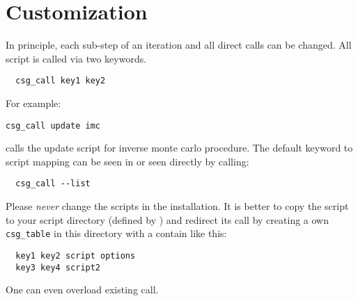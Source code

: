 \section{Customization}
In principle, each sub-step of an iteration and all direct calls can be changed.
All script is called via two keywords.
\begin{verbatim}
  csg_call key1 key2
\end{verbatim}
For example:
\begin{verbatim}
csg_call update imc
\end{verbatim}
calls the update script for inverse monte carlo procedure.
The default keyword to script mapping can be seen in  or seen directly by calling:
\begin{verbatim}
  csg_call --list
\end{verbatim}

Please {\em never} change the scripts in the \votca installation. It is better to copy the script to your script directory (defined by ) and redirect its call by creating a own \texttt{csg\_table} in this directory with a contain like this:
\begin{verbatim}
  key1 key2 script options
  key3 key4 script2
\end{verbatim}
One can even overload existing call.
